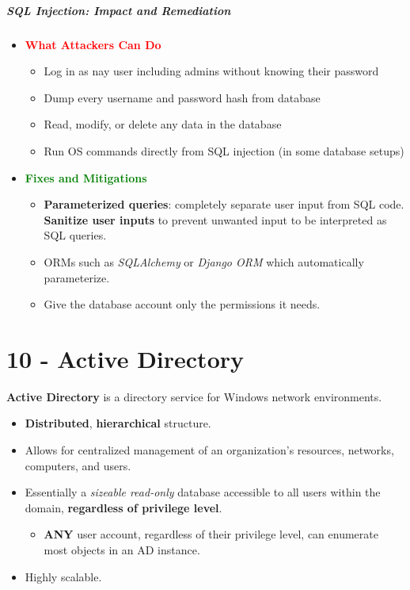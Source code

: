\documentclass[12pt, letterpaper]{article}
\begin{document}
\subsubsection*{SQL Injection: Impact and Remediation}

\begin{itemize}
    \item \textbf{\textcolor{red}{What Attackers Can Do}}
        \begin{itemize}
            \item Log in as nay user including admins without knowing their password
            \item Dump every username and password hash from database
            \item Read, modify, or delete any data in the database
            \item Run OS commands directly from SQL injection (in some database setups)
        \end{itemize}
    \item \textbf{\textcolor{green}{Fixes and Mitigations}}
        \begin{itemize}
            \item \textbf{Parameterized queries}: completely separate user input from SQL code. \textbf{Sanitize user inputs} to prevent unwanted input to be interpreted as SQL queries.
            \item ORMs such as \textit{SQLAlchemy} or \textit{Django ORM} which automatically parameterize.
            \item Give the database account only the permissions it needs.
        \end{itemize}
\end{itemize}

\part*{10 - Active Directory}

\textbf{Active Directory} is a directory service for Windows network environments.

\begin{itemize}
    \item \textbf{Distributed}, \textbf{hierarchical} structure.
    \item Allows for centralized management of an organization's resources, networks, computers, and users.
    \item Essentially a \textit{sizeable read-only} database accessible to all users within the domain, \textbf{regardless of privilege level}.
        \begin{itemize}
            \item \textbf{ANY} user account, regardless of their privilege level, can enumerate most objects in an AD instance.
        \end{itemize}
    \item Highly scalable.
\end{itemize}
\end{document}
